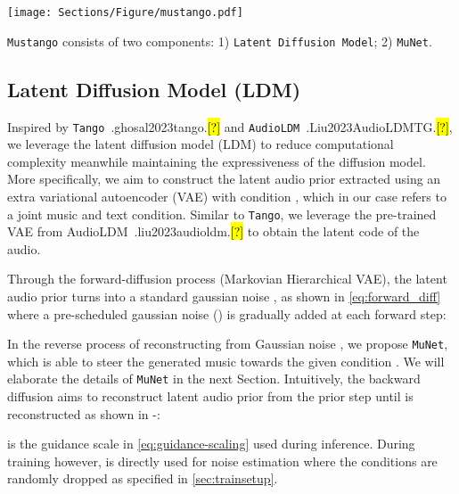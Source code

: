 \documentclass[11pt]{article}
\let\realcite\cite
\renewcommand{\cite}[1]{\ifx.#1.\hl{[?]}\else\realcite{#1}\fi}
\newcommand{\model}{\texttt{Mustango}}
\begin{document}
\begin{figure*}
    \centering
    \texttt{[image: Sections/Figure/mustango.pdf]}
    \caption{Depiction of our proposed \model{} model. Beats and chords are inferred from the caption when they are not provided as input.}
    \label{fig:model}
\end{figure*}









\model{} consists of two components: 1) \texttt{Latent Diffusion Model}; 2) \texttt{MuNet}.







\subsection{Latent Diffusion Model (LDM)}

Inspired by \texttt{Tango}~\cite{ghosal2023tango} and \texttt{AudioLDM}~\cite{Liu2023AudioLDMTG}, we leverage the latent diffusion model (LDM) to reduce computational complexity meanwhile maintaining the expressiveness of the diffusion model. More specifically, we aim to construct the latent audio prior  extracted using an extra variational autoencoder (VAE) with condition  , which in our case refers to a joint music and text condition. Similar to \texttt{Tango}, we leverage the pre-trained VAE from AudioLDM~\cite{liu2023audioldm} to obtain the latent code of the audio.

Through the forward-diffusion process (Markovian Hierarchical VAE), the latent audio prior  turns into a standard gaussian noise , as shown in \cref{eq:forward_diff} where a pre-scheduled gaussian noise () is gradually added at each forward step:


In the reverse process of reconstructing  from Gaussian noise , we propose \texttt{MuNet}, which is able to steer the generated music towards the given condition . We will elaborate the details of \texttt{MuNet} in the next Section. Intuitively, the backward diffusion aims to reconstruct latent audio prior  from the prior step  until  is reconstructed as shown in -:  


 is the guidance scale in \cref{eq:guidance-scaling} used during inference. During training however,  is directly used for noise estimation where the conditions  are randomly dropped as specified in \cref{sec:trainsetup}.
\end{document}
